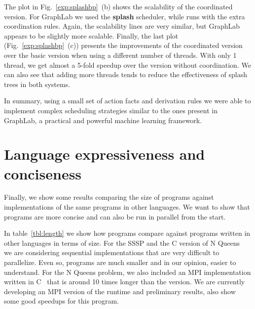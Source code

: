 The plot in Fig.~\ref{exp:splashbp}~(b) shows the scalability of the coordinated version. For GraphLab we used the \textbf{splash} scheduler, while \lang
runs with the extra coordination rules. Again, the scalability lines are very similar, but GraphLab appears to be slightly more scalable.
Finally, the last plot (Fig.~\ref{exp:splashbp}~(c)) presents the improvements of the coordinated version over the basic version when using a different
number of threads. With only 1 thread, we get almost a 5-fold speedup over the version without coordination. We can also see that adding more threads tends to reduce the effectiveness of splash trees in both systems.

In summary, using a small set of action facts and derivation rules we were able to implement complex
scheduling strategies similar to the ones present in GraphLab, a practical and powerful machine learning
framework.

\section{Language expressiveness and conciseness}

Finally, we show some results comparing the size of \lang programs against implementations of the same
programs in other languages. We want to show that \lang programs are more concise and can also be run in parallel from the start.

In table~\ref{tbl:length} we show how \lang programs compare against programs written in other languages in
terms of size. For the SSSP and the C version of N Queens~\cite{8queens-parallel} we are considering sequential implementations
that are very difficult to parallelize. Even so, \lang programs are much smaller and in our opinion, easier
to understand. For the N Queens problem, we also included an MPI implementation written in C~\cite{Rolfe:2008:SMA:1473195.1473217}
that is around 10 times longer than the \lang version. We are currently developing an MPI version
of the \lang runtime and preliminary results, also show some good speedups for this program.

\begin{table}[ht]
\begin{center}
\end{center}
     \caption{Comparison of source code size against other languages.}
     \label{tbl:length}
\end{table}

